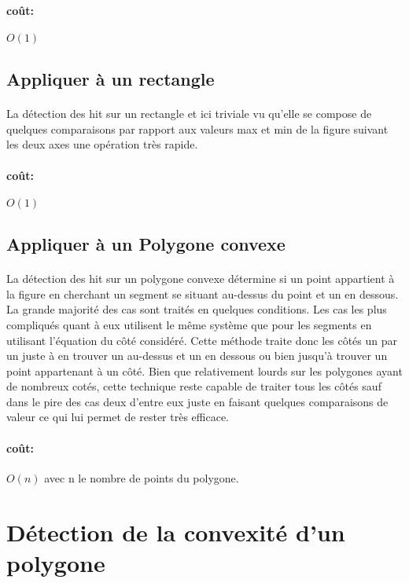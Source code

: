 \paragraph{coût: }
\(O(1)\)

\subsection{Appliquer à un rectangle}
\paragraph{}
La détection des hit sur un rectangle et ici triviale vu qu'elle se compose de quelques comparaisons par rapport aux valeurs max et min de la figure suivant les deux axes une opération très rapide.
\paragraph{coût: }
\(O(1)\)

\subsection{Appliquer à un Polygone convexe}
\paragraph{}
La détection des hit sur un polygone convexe détermine si un point appartient à la figure en cherchant un segment se situant au-dessus du point et un en dessous. La grande majorité des cas sont traités en quelques conditions. Les cas les plus compliqués quant à eux utilisent le même système que pour les segments en utilisant l'équation du côté considéré. Cette méthode traite donc les côtés un par un juste à en trouver un au-dessus et un en dessous ou bien jusqu’à trouver un point appartenant à un côté. Bien que relativement lourds sur les polygones ayant de nombreux cotés, cette technique reste capable de traiter tous les côtés sauf dans le pire des cas deux d'entre eux juste en faisant quelques comparaisons de valeur ce qui lui permet de rester très efficace.
\paragraph{coût: }
\(O(n)\) avec n le nombre de points du polygone.

\section{Détection de la convexité d'un polygone}
